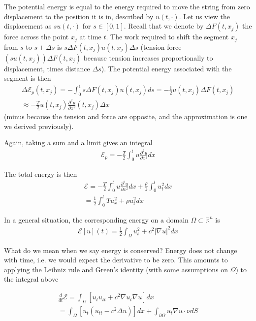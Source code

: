 \documentclass{article}
\newcommand{\R}{{\mathbb{R}}}
\newcommand{\pd}{\partial}
\begin{document}
	The potential energy is equal to the energy required to move the string from zero displacement to the position it is in, described by $u(t,\cdot)$. Let us view the displacement as $su(t,\cdot)$ for $s \in [0,1]$. Recall that we denote by $\Delta F(t,x_j)$ the force across the point $x_j$ at time $t$. The work required to shift the segment $x_j$ from $s$ to $s + \Delta s$ is $s \Delta F(t,x_j)u(t,x_j)\Delta s$ (tension force $(su(t,x_j))\Delta F(t,x_j)$ because tension increases proportionally to displacement, times distance $\Delta s$). The potential energy associated with the segment is then
	\begin{align*}
		\Delta \mathcal{E}_{p}(t,x_j) = -\int_{0}^{1} s\Delta F(t,x_j) u(t,x_j) ds = -\frac{1}{2} u(t,x_j) \Delta F(t,x_j) \\
		\approx -\frac{T}{2} u(t,x_j) \frac{\pd^{2} u}{\pd x^{2}} (t,x_j) \Delta x
	\end{align*}
	(minus because the tension and force are opposite, and the approximation is one we derived previously). 
	
	Again, taking a sum and a limit gives an integral 
	\begin{align*}
		\mathcal{E}_{p} = -\frac{T}{2} \int_{0}^{l} u \frac{\pd^{2} u}{\pd x^{2}} dx
	\end{align*}
	
	The total energy is then
	\begin{align*}
		\mathcal{E} = -\frac{T}{2} \int_{0}^{l} u \frac{\pd^{2} u}{\pd x^{2}} dx +  \frac{\rho}{2} \int_{0}^{l} u_{t}^{2} dx \\
		= \frac{1}{2} \int_{0}^{l} T u_{x}^{2}+ \rho u_{t}^{2} dx 
	\end{align*}
	
	In a general situation, the corresponding energy on a domain $\Omega \subset \R^{n}$ is
	\begin{align*}
		\mathcal{E}[u](t) = \frac{1}{2} \int_{\Omega} u_{t}^{2} + c^{2} |\nabla u|^{2} dx
	\end{align*}
	
	What do we mean when we say energy is conserved? Energy does not change with time, i.e. we would expect the derivative to be zero. This amounts to applying the Leibniz rule and Green's identity (with some assumptions on $\Omega$) to the integral above
	
	\begin{align*}
		\frac{d}{dt} \mathcal{E} = \int_{\Omega} \left[ u_{t}u_{tt} + c^{2} \nabla u_{t} \nabla u \right] dx \\
		= \int_{\Omega} \left[u_{t} (u_{tt} - c^{2} \Delta u) \right] dx  + \int_{\pd \Omega} u_{t} \nabla u \cdot \nu dS
	\end{align*}
	
\end{document}
